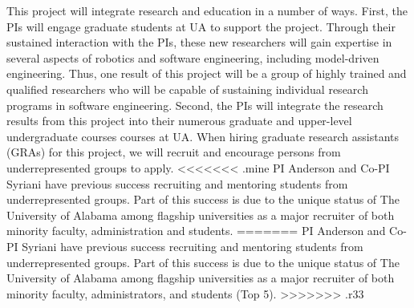 This project will integrate research and education in a number of ways.
First, the PIs will engage graduate students at UA to support the project.
Through their sustained interaction with the PIs, these new researchers will gain expertise in several aspects of robotics and software engineering, including model-driven engineering.
Thus, one result of this project will be a group of highly trained and qualified researchers who will be capable of sustaining individual research programs in software engineering.
Second, the PIs will integrate the research results from this project into their numerous graduate and upper-level undergraduate courses courses at UA.
When hiring graduate research assistants (GRAs) for this project, we will recruit and encourage persons from underrepresented groups to apply.
<<<<<<< .mine
PI Anderson and Co-PI Syriani have previous success recruiting and mentoring students from underrepresented groups.  Part of this success is due to the unique status of The University of Alabama among flagship universities as a major recruiter of both minority faculty, administration and students.
=======
PI Anderson and Co-PI Syriani have previous success recruiting and mentoring students from underrepresented groups.  Part of this success is due to the unique status of The University of Alabama among flagship universities as a major recruiter of both minority faculty, administrators, and students (Top 5).
>>>>>>> .r33





